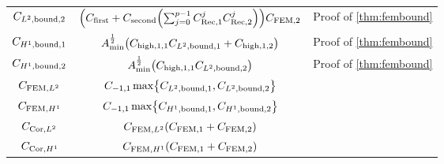 \begin{longtabu}{ccc}
  $C_{L^{2},\mathrm{bound},2}$&$\mleft(\Cfirst+ \Csecond \mleft(\sum_{j=0}^{p-1} \CReco^j \CRect^j\mright)\mright)\CFEMttilde$&Proof of \cref{thm:fembound}\\
  $C_{H^{1},\mathrm{bound},1}$&$\Amin^{\half} \mleft(\Chighfn{1,1}\CLtboundo + \Chighfn{1,2}\mright)$&Proof of \cref{thm:fembound}\\
  $C_{H^{1},\mathrm{bound},2}$&$\Amin^{\half} \mleft(\Chighfn{1,1}\CLtboundt\mright)$&Proof of \cref{thm:fembound}\\
  $C_{\mathrm{FEM},L^{2}}$&$\Cfn{-1,1} \max\set{\CLtboundo,\CLtboundt}$&\\
  $C_{\mathrm{FEM},H^{1}}$&$ \Cfn{-1,1}\max\set{\CHoboundo,\CHoboundt}$&\\
  $C_{\mathrm{Cor},L^{2}}$&$\CFEMLt\mleft(\CFEMo+\CFEMt\mright)$&\\
  $C_{\mathrm{Cor},H^{1}}$&$\CFEMHo\mleft(\CFEMotilde+\CFEMttilde\mright)$&\\
\bottomrule
\end{longtabu}
